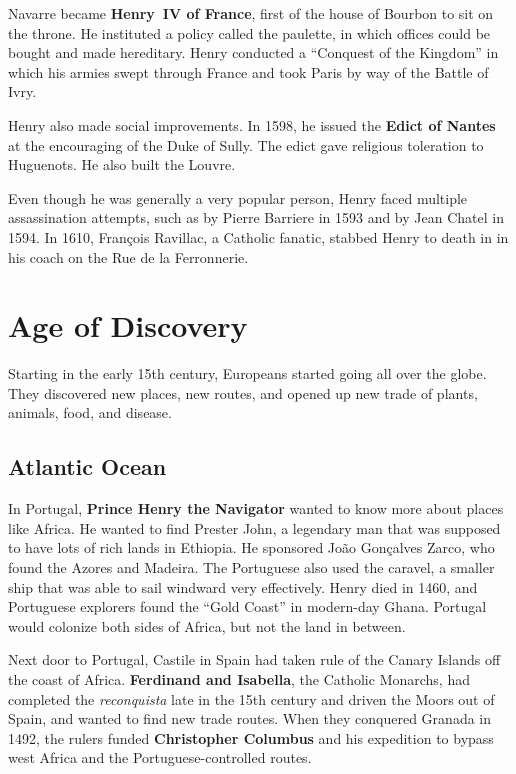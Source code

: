 Navarre became \textbf{Henry~IV of France}, first of the house of Bourbon to sit on the throne.
He instituted a policy called the paulette, in which offices could be bought and made hereditary.
Henry conducted a ``Conquest of the Kingdom'' in which his armies swept through France and took Paris
by way of the Battle of Ivry.

Henry also made social improvements.
In 1598, he issued the \textbf{Edict of Nantes} at the encouraging of the Duke of Sully.
The edict gave religious toleration to Huguenots.
He also built the Louvre.

Even though he was generally a very popular person, Henry faced multiple assassination attempts,
such as by Pierre Barriere in 1593 and by Jean Chatel in 1594.
In 1610, Fran\c{c}ois Ravillac, a Catholic fanatic,
stabbed Henry to death in in his coach on the Rue de la Ferronnerie.

\section{Age of Discovery}

Starting in the early 15th century, Europeans started going all over the globe.
They discovered new places, new routes, and opened up new trade of plants, animals, food, and disease.

\subsection*{Atlantic Ocean}

In Portugal, \textbf{Prince Henry the Navigator} wanted to know more about places like Africa.
He wanted to find Prester John, a legendary man that was supposed to have lots of rich lands in Ethiopia.
He sponsored Jo\~ao Gon\c{c}alves Zarco, who found the Azores and Madeira.
The Portuguese also used the caravel, a smaller ship that was able to sail windward very effectively.
Henry died in 1460, and Portuguese explorers found the ``Gold Coast'' in modern-day Ghana.
Portugal would colonize both sides of Africa, but not the land in between.

Next door to Portugal, Castile in Spain had taken rule of the Canary Islands off the coast of Africa.
\textbf{Ferdinand and Isabella}, the Catholic Monarchs, had completed the \textit{reconquista}
late in the 15th century and driven the Moors out of Spain, and wanted to find new trade routes.
When they conquered Granada in 1492, the rulers funded \textbf{Christopher Columbus}
and his expedition to bypass west Africa and the Portuguese-controlled routes.

